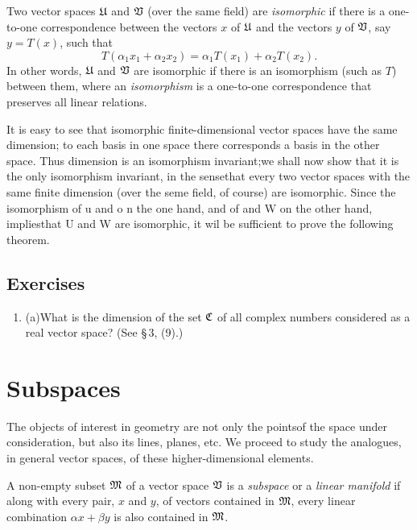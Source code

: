 \begin{definition}
    Two vector spaces \(\frak{U}\) and \(  \frak{V}\) (over the same field)
    are \emph{isomorphic} if there is a one-to-one correspondence between the
    vectors \(x\) of \(\frak{U}\) and the vectors \(y\) of \(  \frak{V}\),
    say \(y = T(x)\), such that
    \begin{equation*}
        T(\alpha_1 x_1 + \alpha_2 x_2) = \alpha_1 T(x_1) + \alpha_2 T(x_2).
    \end{equation*}
    In other words, \(\frak{U}\) and \(  \frak{V}\)  are isomorphic if there
    is an isomorphism (such as \(T\)) between them, where an \emph{isomorphism}
    is a one-to-one correspondence that preserves all linear relations.
\end{definition}

It is easy to see that isomorphic finite-dimensional vector spaces have the same dimension; to each basis in one space there corresponds a basis in the other space. Thus dimension is an isomorphism invariant;we shall now show that it is the only isomorphism invariant, in the sensethat every two vector spaces with the same finite dimension (over the seme field, of course) are isomorphic. Since the isomorphism of u and o n the one hand, and of  and W on the other hand, impliesthat U and W are isomorphic, it wil be sufficient to prove the following theorem.

{\small
\subsection*{Exercises}

\begin{enumerate}
    \item (a)What is the dimension of the set \(\frak{C}\) of all complex numbers considered as a real vector space? (See \S\,3, (9).)
\end{enumerate}

}

\section{Subspaces}


The objects of interest in geometry are not only the pointsof the space under consideration, but also its lines, planes, etc. We proceed to study the analogues, in general vector spaces, of these higher-dimensional elements.

\begin{definition}
    A non-empty subset \(\frak{M}\) of a vector space \(  \frak{V}\) is a \emph{subspace} or a \emph{linear manifold} if along with every pair, \(x\) and \(y\), of vectors contained in \(\frak{M}\), every linear combination \(\alpha x + \beta y\) is also contained in \(\frak{M}\).
\end{definition}

